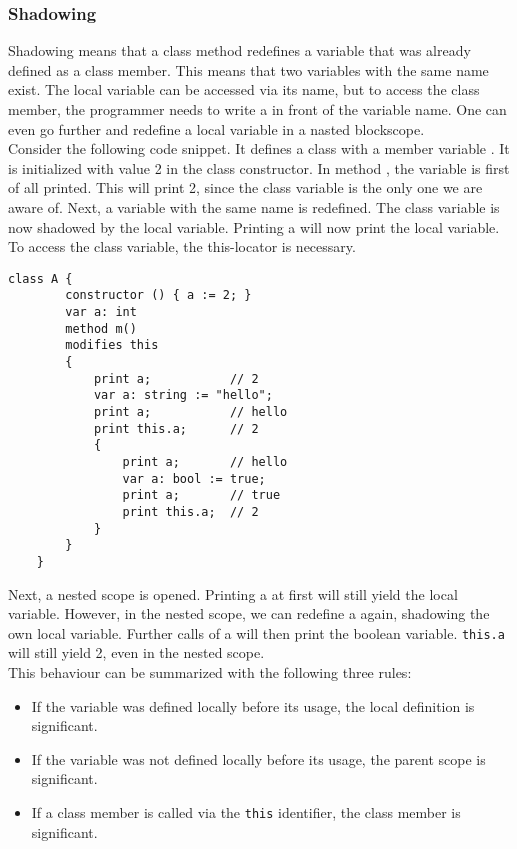 \subsubsection{Shadowing}

Shadowing means that a class method redefines a variable that was already defined as a class member. This means that two variables with the same name exist. The local variable can be accessed via its name, but to access the class member, the programmer needs to write a  in front of the variable name. One can even go further and redefine a local variable in a nasted blockscope.\\

Consider the following code snippet. It defines a class with a member variable . It is initialized with value 2 in the class constructor. In method , the variable  is first of all printed. This will print 2, since the class variable is the only one we are aware of. Next, a variable with the same name is redefined. The class variable is now shadowed by the local variable. Printing a will now print the local variable. To access the class variable, the this-locator is necessary.

\begin{lstlisting}[caption={Complex Shadowing Example}, captionpos=b, label={lst:shadowing}]
    class A {
        constructor () { a := 2; }
        var a: int
        method m()
        modifies this
        {
            print a;           // 2
            var a: string := "hello";
            print a;           // hello
            print this.a;      // 2
            {
                print a;       // hello
                var a: bool := true;
                print a;       // true
                print this.a;  // 2
            }
        }
    }
\end{lstlisting}

Next, a nested scope is opened. Printing a at first will still yield the local variable. However, in the nested scope, we can redefine a again, shadowing the own local variable. Further calls of a will then print the boolean variable. \texttt{this.a} will still yield 2, even in the nested scope.\\

This behaviour can be summarized with the following three rules:
\begin{itemize}
    \item If the variable was defined locally before its usage, the local definition is significant.
    \item If the variable was not defined locally before its usage, the parent scope is significant.
    \item If a class member is called via the \texttt{this} identifier, the class member is significant.
\end{itemize}

